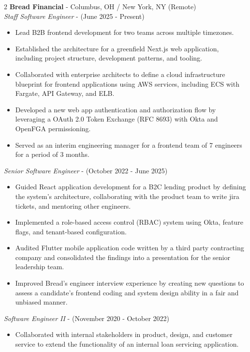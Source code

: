 \documentclass[10pt]{article}
\begin{document}
\begin{paracol}{2}
    \textbf{Bread Financial} - Columbus, OH / New York, NY (Remote) \\
    \textit{Staff Software Engineer} - {\footnotesize{(June 2025 - Present)}}
    \begin{itemize}
        \item Lead B2B frontend development for two teams across multiple timezones.
        \item Established the architecture for a greenfield Next.js web application, including project structure, development patterns, and tooling.
        \item Collaborated with enterprise architects to define a cloud infrastructure blueprint for frontend applications using AWS services, including ECS with Fargate, API Gateway, and ELB.
        \item Developed a new web app authentication and authorization flow by leveraging a OAuth 2.0 Token Exchange (RFC 8693) with Okta and OpenFGA permissioning.
        \item Served as an interim engineering manager for a frontend team of 7 engineers for a period of 3 months.
    \end{itemize}
    \textit{Senior Software Engineer} - {\footnotesize{(October 2022 - June 2025)}}
    \begin{itemize}
        \item Guided React application development for a B2C lending product by defining the system's architecture, collaborating with the product team to write jira tickets, and mentoring other engineers.
        \item Implemented a role-based access control (RBAC) system using Okta, feature flags, and tenant-based configuration.
        \item Audited Flutter mobile application code written by a third party contracting company and consolidated the findings into a presentation for the senior leadership team.
        \item Improved Bread's engineer interview experience by creating new questions to assess a candidate's frontend coding and system design ability in a fair and unbiased manner.
    \end{itemize}
    \textit{Software Engineer II} - {\footnotesize{(November 2020 - October 2022)}}
    \begin{itemize}
        \item Collaborated with internal stakeholders in product, design, and customer service to extend the functionality of an internal loan servicing application.
    \end{itemize}


\end{paracol}
\end{document}
